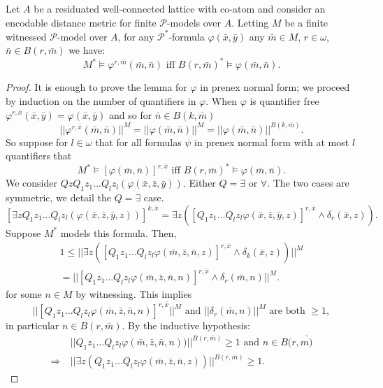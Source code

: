 \documentclass{lmcs} %
\newcommand{\?}{\ensuremath{\mkern0.4\thinmuskip}}
\let\phi=\varphi
\newcommand{\CP}{\mathcal{P}}
\begin{document}
\begin{lem}\label{lem:localform}
    Let $A$ be a residuated well-connected lattice with co-atom and consider an encodable distance metric for finite $\CP$-models over $A$. Letting $M$ be a finite witnessed $\CP$-model over $A$, for any $\CP^\ast$-formula $\phi(\bar{x},\bar{y})$ any $\bar{m}\in M$, $r\in\omega$, $\bar{n}\in B(r,\bar{m})$ we have:
    \[M^\ast\models\phi^{r,\bar{m}}(\bar{m},\bar{n})\text{ iff }B(r,\bar{m})^\ast\models\phi(\bar{m},\bar{n}).\]
\end{lem}
\begin{proof}
    It is enough to prove the lemma for $\phi$ in prenex normal form; we proceed by induction on the number of quantifiers in $\phi$. When $\phi$ is quantifier free $\phi^{r,\bar{x}}(\bar{x},\bar{y})=\phi(\bar{x},\bar{y})$ and so for $\bar{n}\in B(k,\bar{m})$ \[||\phi^{r,\bar{x}}(\bar{m},\bar{n})||^M=||\phi(\bar{m},\bar{n})||^M=||\phi(\bar{m},\bar{n})||^{B(k,\bar{m})}.\]
    So suppose for $l\in\omega$ that for all formulas $\psi$ in prenex normal form with at most $l$ quantifiers that\[M^\ast\models[\phi(\bar{m},\bar{n})]^{r,\bar{x}}\text{ iff }B(r,\bar{m})^\ast\models \phi(\bar{m},\bar{n}).\]
    We consider $QzQ_1z_1...Q_lz_l(\phi(\bar{x},\bar{z},\bar{y}))$. Either $Q=\exists$ or $\forall$. The two cases are symmetric, we detail the $Q=\exists$ case.
    \[[\exists z Q_1z_1...Q_lz_l(\phi(\bar{x},\bar{z},\bar{y},z))]^{k,\bar{x}}=\exists z([Q_1z_1...Q_lz_l\phi(\bar{x},\bar{z},\bar{y},z)]^{r,\bar{x}}
    \land \delta_r(\bar{x},z)).\]
 Suppose $M^\ast$ models this formula. Then,
    \begin{multline*}
    1\leq ||\exists z([Q_1z_1...Q_lz_l\phi(\bar{m},\bar{z},\bar{n},z)]^{r,\bar{x}}\land \delta_k(\bar{x},z))||^M\\
    =||[Q_1z_1...Q_lz_l\phi(\bar{m},\bar{z},\bar{n},n)]^{r,\bar{x}}\land \delta_r(\bar{m},n)||^M.
    \end{multline*}
    for some $n\in M$ by witnessing. This implies
    \[||[Q_1z_1...Q_lz_l\phi(\bar{m},\bar{z},\bar{n},n)]^{r,\bar{x}}||^M
    \text{ and }
    ||\delta_r(\bar{m},n)||^M
    \text{ are both }\geq 1,\]
    in particular $n\in B(r,\bar{m})$. By the inductive hypothesis:
    \begin{align*}
    &||Q_1z_1...Q_lz_l\phi(\bar{m},\bar{z},\bar{n},n))||^{B(r,\bar{m})}\geq 1 \text{ and } n\in B(r,\bar{m)}\\
    \Rightarrow\ &||\exists z(Q_1z_1...Q_lz_l\phi(\bar{m},\bar{z},\bar{n},z))||^{B(r,\bar{m})}\geq 1.
    \end{align*}
    

\end{proof}
\end{document}
